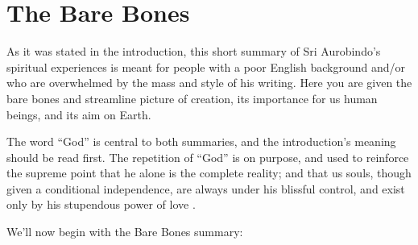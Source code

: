 \documentclass[12pt,a4paper]{book}
\begin{document}
\chapter*{The Bare Bones}


As it was stated in the introduction, this short summary of Sri
Aurobindo's spiritual experiences is meant for people with a poor
English background and/or who are overwhelmed by the mass and style of
his writing. Here you are given the bare bones and streamline picture
of creation, its importance for us human beings, and its aim on Earth.

The word ``God'' is central to both summaries, and the introduction's
meaning should be read first. The repetition of ``God'' is on purpose,
and used to reinforce the supreme point that he alone is the complete
reality; and that us souls, though given a conditional independence,
are always under his blissful control, and exist only by his
stupendous power of love .

\noindent We'll now begin with the Bare Bones summary:
\end{document}
